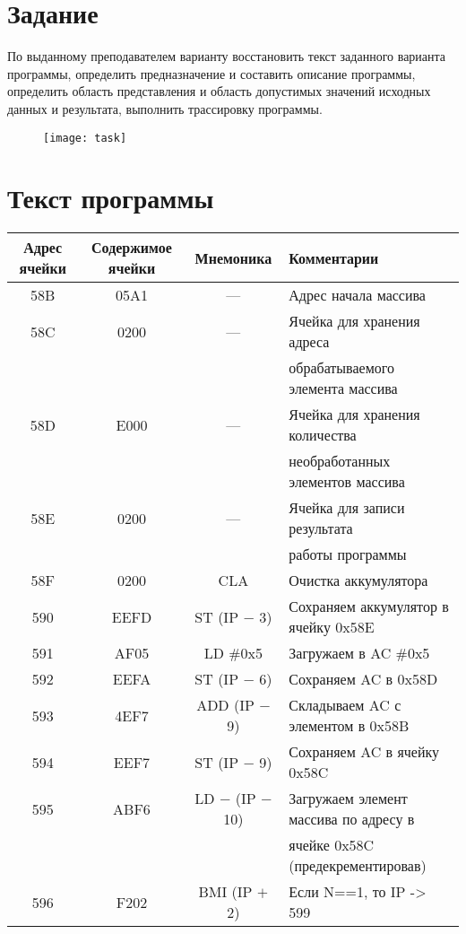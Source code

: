 \section{Задание}
По выданному преподавателем варианту восстановить текст заданного варианта программы, определить предназначение и составить описание программы, определить область представления и область допустимых значений исходных данных и результата, выполнить трассировку программы.
\begin{figure}[H]
\centering
\texttt{[image: task]}
\label{pic:task}
\end{figure}

\section{Текст программы}
\begin{center}
\begin{tabular}{|c|c|c|l|}
\hline
\textbf{Адрес ячейки} & \textbf{Содержимое ячейки} & \textbf{Мнемоника} & \textbf{Комментарии}\\
\hline
58B & 05A1 & --- & Адрес начала массива\\
58C & 0200 & --- & Ячейка для хранения адреса \\
 & & & обрабатываемого элемента массива\\
58D & E000 & --- & Ячейка для хранения количества \\
 & & &необработанных элементов массива\\
58E & 0200 & --- & Ячейка для записи результата  \\ 
& & & работы программы\\
\hline
\hline
58F & 0200 & CLA & Очистка аккумулятора\\
590 & EEFD & ST (IP $-$ 3) & Сохраняем аккумулятор в ячейку 0x58E\\
\hline
591 & AF05 & LD \#0x5 & Загружаем в AC \#0x5\\
592 & EEFA & ST (IP $-$ 6) & Сохраняем AC в 0x58D\\
\hline
593 & 4EF7 & ADD (IP $-$ 9) & Складываем AC с элементом в 0x58B\\
594 & EEF7 & ST (IP $-$ 9) & Сохраняем AC в ячейку 0x58C\\
\hline
595 & ABF6 & LD $-$ (IP $-$ 10) & Загружаем элемент массива по адресу в \\
 & & & ячейке 0x58C (предекрементировав)\\
596 & F202 & BMI (IP $+$ 2) & Если N==1, то IP -> 599\\

\end{tabular}
\end{center}
